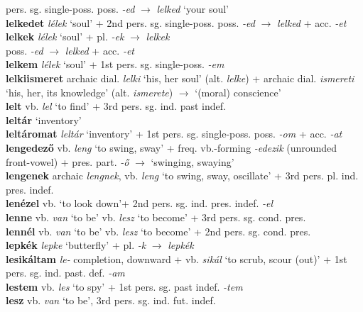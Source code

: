 \documentclass[11pt]{article}
\begin{document}
  pers. sg. single\hyp{}poss. poss. \emph{-ed}
  $\rightarrow$ \emph{lelked} `your soul' \\
\textbf{lelkedet} \emph{lélek} `soul' + 2nd
  pers. sg. single\hyp{}poss. poss. \emph{-ed} $\rightarrow$ \emph{lelked} + acc. \emph{-et} \\
\textbf{lelkek} \emph{lélek} `soul' + pl. \emph{-ek} $\rightarrow$ \emph{lelkek} \\
poss. \emph{-ed} $\rightarrow$ \emph{lelked} + acc. \emph{-et} \\
\textbf{lelkem} \emph{lélek} `soul' + 1st pers. sg. single\hyp{}poss. \emph{-em} \\
\textbf{lelkiismeret} archaic dial. \emph{lelki} `his, her soul'
(alt. \emph{lelke}) + archaic dial. \emph{ismereti} `his, her, its
knowledge' (alt. \emph{ismerete}) $\rightarrow$ `(moral)
conscience' \\
\textbf{lelt} vb. \emph{lel} `to find' + 3rd pers. sg. ind. past indef. \\
\textbf{leltár} `inventory' \\
\textbf{leltáromat} \emph{leltár} `inventory' + 1st
pers. sg. single\hyp{}poss. poss. \emph{-om} + acc. \emph{-at} \\
\textbf{lengedező} vb. \emph{leng} `to swing, sway' +
freq. vb.\hyp{}forming \emph{-edezik} (unrounded front\hyp{}vowel) +
pres. part. \emph{-ő} $\rightarrow$ `swinging, swaying' \\
\textbf{lengenek} archaic \emph{lengnek}, vb. \emph{leng} `to swing,
sway, oscillate' + 3rd pers. pl. ind. pres. indef. \\
\textbf{lenézel} vb. `to look down'+ 2nd
pers. sg. ind. pres. indef. \emph{-el} \\
\textbf{lenne} vb. \emph{van} `to be' \textbar\textbar{}
vb. \emph{lesz} `to become' + 3rd pers. sg. cond. pres. \\
\textbf{lennél} vb. \emph{van} `to be' \textbar\textbar{}
vb. \emph{lesz} `to become' + 2nd pers. sg. cond. pres. \\
\textbf{lepkék} \emph{lepke} `butterfly' + pl. \emph{-k}
$\rightarrow$ \emph{lepkék} \\
\textbf{lesikáltam} \emph{le-} completion, downward +
vb. \emph{sikál} `to scrub, scour (out)' + 1st pers. sg. ind. past. def.
\emph{-am} \\
\textbf{lestem} vb. \emph{les} `to spy' + 1st pers. sg. past
indef. \emph{-tem} \\
\textbf{lesz} vb. \emph{van} `to be', 3rd
pers. sg. ind. fut. indef. \\
\end{document}

